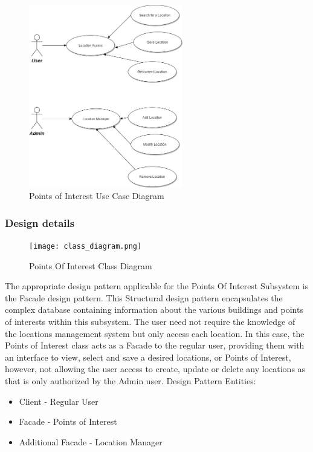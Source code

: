 \documentclass{article}
\begin{document}
\mbox{}\\
    \bigskip
    
\begin{figure}[h!]
        \begin{center}
            \includegraphics[width=0.6\textwidth]{POI_Use_Case_Diagram.jpg} \caption{Points of Interest Use Case Diagram}
        \end{center}
    \end{figure}
    
\newpage
\subsubsection{Design details}

\begin{figure}[h!]
        \begin{center}
            \texttt{[image: class\_diagram.png]} \caption{Points Of Interest Class Diagram}
        \end{center}
    \end{figure}

The appropriate design pattern applicable for the Points Of Interest Subsystem is the Facade design pattern. This Structural design pattern encapsulates the complex database containing information about the various buildings and points of interests within this subsystem. The user need not require the knowledge of the locations management system but only access each location.
\newline 
\noindent In this case, the Points of Interest class acts as a Facade to the regular user, providing them with an interface to view, select and save a desired locations, or Points of Interest, however, not allowing the user access to create, update or delete any locations as that is only authorized by the Admin user.
\newline \newline
\noindent Design Pattern Entities:
\begin{itemize}
\item Client - Regular User
\item Facade - Points of Interest
\item Additional Facade - Location Manager
\end{itemize}
\end{document}
